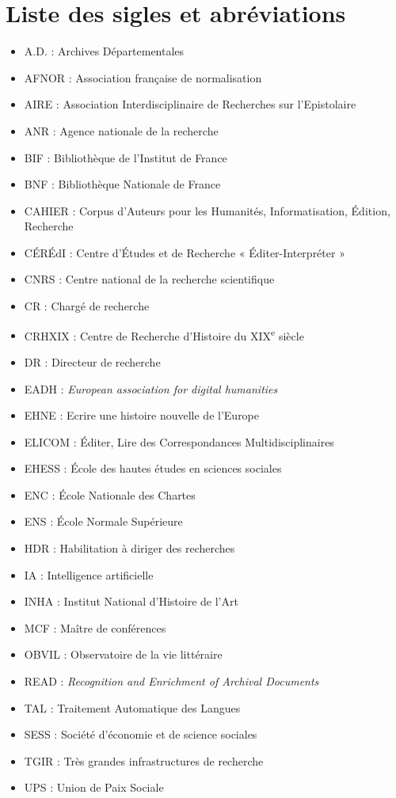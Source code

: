 \chapter*{Liste des sigles et abréviations}

\begin{itemize}
\item A.D. : Archives Départementales
\item AFNOR : Association française de normalisation
\item AIRE : Association Interdisciplinaire de Recherches sur l'Epistolaire
\item ANR : Agence nationale de la recherche
\item BIF : Bibliothèque de l'Institut de France 
\item BNF : Bibliothèque Nationale de France
\item CAHIER : Corpus d’Auteurs pour les Humanités, Informatisation, Édition, Recherche
\item CÉRÉdI : Centre d’Études et de Recherche « Éditer-Interpréter »
\item CNRS : Centre national de la recherche scientifique
\item CR : Chargé de recherche
\item CRHXIX : Centre de Recherche d'Histoire du XIX\textsuperscript{e} siècle
\item DR : Directeur de recherche
\item EADH : \emph{European association for digital humanities}
\item EHNE : Ecrire une histoire nouvelle de l’Europe
\item ELICOM : Éditer, Lire des Correspondances Multidisciplinaires
\item EHESS : École des hautes études en sciences sociales
\item ENC : École Nationale des Chartes
\item ENS : École Normale Supérieure
\item HDR : Habilitation à diriger des recherches
\item IA : Intelligence artificielle
\item INHA : Institut National d'Histoire de l'Art
\item MCF : Maître de conférences
\item OBVIL : Observatoire de la vie littéraire
\item READ : \emph{Recognition and Enrichment of Archival Documents}
\item TAL : Traitement Automatique des Langues
\item SESS : Société d'économie et de science sociales
\item TGIR : Très grandes infrastructures de recherche
\item UPS : Union de Paix Sociale
\end{itemize}

